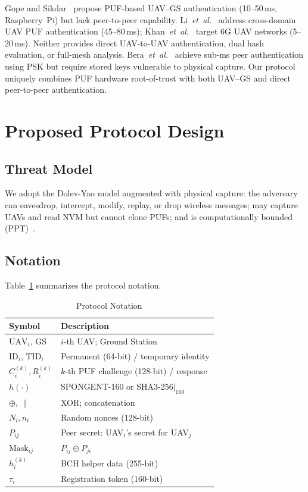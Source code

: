 \documentclass[conference]{IEEEtran}
\begin{document}
Gope and Sikdar~\cite{puf_lightweight_uav} propose PUF-based UAV--GS authentication (10--50\,ms, Raspberry~Pi) but lack peer-to-peer capability. Li~\emph{et~al.}~\cite{puf_uav_cross_domain} address cross-domain UAV PUF authentication (45--80\,ms); Khan~\emph{et~al.}~\cite{puf_6g_uav} target 6G UAV networks (5--20\,ms). Neither provides direct UAV-to-UAV authentication, dual hash evaluation, or full-mesh analysis. Bera~\emph{et~al.}~\cite{peer2peer_auth} achieve sub-ms peer authentication using PSK but require stored keys vulnerable to physical capture. Our protocol uniquely combines PUF hardware root-of-trust with both UAV--GS and direct peer-to-peer authentication.

\section{Proposed Protocol Design}
\label{sec:protocol}

\subsection{Threat Model}
We adopt the Dolev-Yao model augmented with physical capture: the adversary can eavesdrop, intercept, modify, replay, or drop wireless messages; may capture UAVs and read NVM but cannot clone PUFs; and is computationally bounded (PPT)~\cite{dolev_yao}.

\subsection{Notation}
Table~\ref{tab:notation} summarizes the protocol notation.

\begin{table}[H]
\centering
\caption{Protocol Notation}
\label{tab:notation}
\footnotesize
\begin{tabular}{@{}ll@{}}
\toprule
\textbf{Symbol} & \textbf{Description} \\
\midrule
$\text{UAV}_i$, GS & $i$-th UAV; Ground Station \\
$\text{ID}_i$, $\text{TID}_i$ & Permanent (64-bit) / temporary identity \\
$C_i^{(k)}, R_i^{(k)}$ & $k$-th PUF challenge (128-bit) / response \\
$h(\cdot)$ & SPONGENT-160 or SHA3-256$|_{160}$ \\
$\oplus$, $\|$ & XOR; concatenation \\
$N_i, n_i$ & Random nonces (128-bit) \\
$P_{ij}$ & Peer secret: UAV$_i$'s secret for UAV$_j$ \\
$\text{Mask}_{ij}$ & $P_{ij} \oplus P_{ji}$ \\
$h_i^{(k)}$ & BCH helper data (255-bit) \\
$\tau_i$ & Registration token (160-bit) \\
\bottomrule
\end{tabular}
\end{table}
\end{document}
